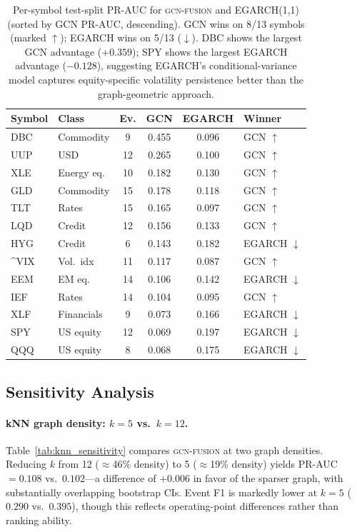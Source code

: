 \documentclass[sigconf]{acmart}
\begin{document}
\begin{table}[t]
\caption{Per-symbol test-split PR-AUC for \textsc{gcn-fusion} and EGARCH(1,1)
(sorted by GCN PR-AUC, descending).
GCN wins on 8/13 symbols (marked $\uparrow$); EGARCH wins on 5/13 ($\downarrow$).
DBC shows the largest GCN advantage ($+0.359$); SPY shows the largest EGARCH
advantage ($-0.128$), suggesting EGARCH's conditional-variance model captures
equity-specific volatility persistence better than the graph-geometric approach.}
\label{tab:per_symbol}
\scriptsize
\begin{tabular}{@{}llcccl@{}}
\toprule
Symbol & Class & Ev. & GCN & EGARCH & Winner \\
\midrule
DBC   & Commodity    & 9  & 0.455 & 0.096 & GCN $\uparrow$ \\
UUP   & USD          & 12 & 0.265 & 0.100 & GCN $\uparrow$ \\
XLE   & Energy eq.   & 10 & 0.182 & 0.130 & GCN $\uparrow$ \\
GLD   & Commodity    & 15 & 0.178 & 0.118 & GCN $\uparrow$ \\
TLT   & Rates        & 15 & 0.165 & 0.097 & GCN $\uparrow$ \\
LQD   & Credit       & 12 & 0.156 & 0.133 & GCN $\uparrow$ \\
HYG   & Credit       & 6  & 0.143 & 0.182 & EGARCH $\downarrow$ \\
\^{}VIX & Vol.\ idx  & 11 & 0.117 & 0.087 & GCN $\uparrow$ \\
EEM   & EM eq.       & 14 & 0.106 & 0.142 & EGARCH $\downarrow$ \\
IEF   & Rates        & 14 & 0.104 & 0.095 & GCN $\uparrow$ \\
XLF   & Financials   & 9  & 0.073 & 0.166 & EGARCH $\downarrow$ \\
SPY   & US equity    & 12 & 0.069 & 0.197 & EGARCH $\downarrow$ \\
QQQ   & US equity    & 8  & 0.068 & 0.175 & EGARCH $\downarrow$ \\
\bottomrule
\end{tabular}
\end{table}

\subsection{Sensitivity Analysis}
\label{sec:sensitivity}

\paragraph{kNN graph density: $k{=}5$ vs.\ $k{=}12$.}
Table~\ref{tab:knn_sensitivity} compares \textsc{gcn-fusion} at two graph
densities. Reducing $k$ from 12 ($\approx$46\% density) to 5 ($\approx$19\%
density) yields PR-AUC $= 0.108$ vs.\ $0.102$---a difference of $+0.006$ in
favor of the sparser graph, with substantially overlapping bootstrap CIs.
Event F1 is markedly lower at $k{=}5$ ($0.290$ vs.\ $0.395$), though this
reflects operating-point differences rather than ranking ability.
\end{document}
